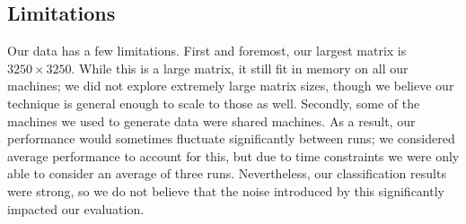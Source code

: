 \subsection{Limitations}
Our data has a few limitations.
First and foremost, our largest matrix is $3250\times{3250}$.
While this is a large matrix, it still fit in memory on all our machines; we did not explore extremely large matrix sizes, though we believe our technique is general enough to scale to those as well.
Secondly, some of the machines we used to generate data were shared machines.
As a result, our performance would sometimes fluctuate significantly between runs; we considered average performance to account for this, but due to time constraints we were only able to consider an average of three runs.
Nevertheless, our classification results were strong, so we do not believe that the noise introduced by this significantly impacted our evaluation.
